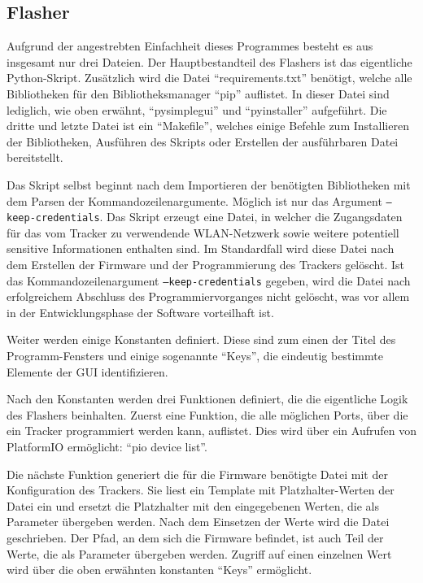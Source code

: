 \subsection{Flasher}
Aufgrund der angestrebten Einfachheit dieses Programmes besteht es aus insgesamt nur drei Dateien.
Der Hauptbestandteil des Flashers ist das eigentliche Python-Skript.
Zusätzlich wird die Datei \enquote{requirements.txt} benötigt, welche alle Bibliotheken für den
Bibliotheksmanager \enquote{pip} auflistet.
In dieser Datei sind lediglich, wie oben erwähnt, \enquote{pysimplegui} und \enquote{pyinstaller} aufgeführt.
Die dritte und letzte Datei ist ein \enquote{Makefile}, welches einige Befehle zum Installieren der Bibliotheken,
Ausführen des Skripts oder Erstellen der ausführbaren Datei bereitstellt.

Das Skript selbst beginnt nach dem Importieren der benötigten Bibliotheken mit dem Parsen der
Kommandozeilenargumente.
Möglich ist nur das Argument \texttt{--keep-credentials}.
Das Skript erzeugt eine Datei, in welcher die Zugangsdaten für das vom Tracker zu verwendende
\gls{WLAN}-Netzwerk sowie weitere potentiell sensitive Informationen enthalten sind. Im
Standardfall wird diese Datei nach dem Erstellen der Firmware und der Programmierung des Trackers
gelöscht. Ist das Kommandozeilenargument \texttt{--keep-credentials} gegeben, wird die Datei nach
erfolgreichem Abschluss des Programmiervorganges nicht gelöscht, was vor allem in der
Entwicklungsphase der Software vorteilhaft ist.

Weiter werden einige Konstanten definiert.
Diese sind zum einen der Titel des Programm-Fensters und einige sogenannte \enquote{Keys},
die eindeutig bestimmte Elemente der \gls{GUI} identifizieren.

Nach den Konstanten werden drei Funktionen definiert, die die eigentliche Logik des Flashers beinhalten.
Zuerst eine Funktion, die alle möglichen Ports, über die ein Tracker programmiert werden kann, auflistet.
Dies wird über ein Aufrufen von PlatformIO ermöglicht: \enquote{pio device list}.

Die nächste Funktion generiert die für die Firmware benötigte Datei mit der Konfiguration des Trackers.
Sie liest ein Template mit Platzhalter-Werten der Datei ein und ersetzt die Platzhalter mit den eingegebenen Werten, die als Parameter übergeben werden.
Nach dem Einsetzen der Werte wird die Datei geschrieben.
Der Pfad, an dem sich die Firmware befindet, ist auch Teil der Werte, die als Parameter übergeben werden.
Zugriff auf einen einzelnen Wert wird über die oben erwähnten konstanten \enquote{Keys} ermöglicht.

